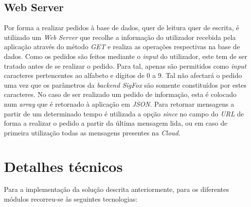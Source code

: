 \documentclass[a4paper]{article}
\begin{document}
\subsection{Web Server}

Por forma a realizar pedidos à base de dados, quer de leitura quer de escrita, é utilizado um \textit{Web Server} que recolhe a informação do utilizador recebida pela aplicação através do método \textit{GET} e realiza as operações respectivas na base de dados. Como os pedidos são feitos mediante o \textit{input} do utilizador, este tem de ser tratado antes de se realizar o pedido. Para tal, apenas são permitidos como \textit{input} caracteres pertencentes ao alfabeto e dígitos de 0 a 9. Tal não afectará o pedido uma vez que os parâmetros da \textit{backend SigFox} são somente constituídos por estes caracteres.
No caso de ser realizado um pedido de informação, esta é colocado num \textit{array} que é retornado à aplicação em \textit{JSON}. Para retornar mensagens a partir de um determinado tempo é utilizada a opção \textit{since} no campo do \textit{URL} de forma a realizar o pedido a partir da última mensagem lida, ou em caso de primeira utilização todas as mensagens presentes na \textit{Cloud}.

\section{Detalhes técnicos}

Para a implementação da solução descrita anteriormente, para os diferentes módulos recorreu-se às seguintes tecnologias:
\end{document}
